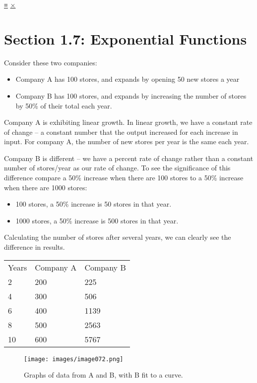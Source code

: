 \protect\hyperlink{main-nav}{≡} \protect\hyperlink{close-nav}{×}

\hypertarget{section-1.7-exponential-functions}{%
\section{Section 1.7: Exponential
Functions}\label{section-1.7-exponential-functions}}

Consider these two companies:

\begin{itemize}
\tightlist
\item
  Company A has 100 stores, and expands by opening 50 new stores a year
\item
  Company B has 100 stores, and expands by increasing the number of
  stores by 50\% of their total each year.
\end{itemize}

Company A is exhibiting linear growth. In linear growth, we have a
constant rate of change -- a constant number that the output increased
for each increase in input. For company A, the number of new stores per
year is the same each year.

Company B is different -- we have a percent rate of change rather than a
constant number of stores/year as our rate of change. To see the
significance of this difference compare a 50\% increase when there are
100 stores to a 50\% increase when there are 1000 stores:

\begin{itemize}
\tightlist
\item
  100 stores, a 50\% increase is 50 stores in that year.
\item
  1000 stores, a 50\% increase is 500 stores in that year.
\end{itemize}

Calculating the number of stores after several years, we can clearly see
the difference in results.

\begin{longtable}[]{@{}lll@{}}
\toprule
\endhead
Years & Company A & Company B\tabularnewline
2 & 200 & 225\tabularnewline
4 & 300 & 506\tabularnewline
6 & 400 & 1139\tabularnewline
8 & 500 & 2563\tabularnewline
10 & 600 & 5767\tabularnewline
\bottomrule
\end{longtable}

\begin{figure}
\centering
\texttt{[image: images/image072.png]}
\caption{Graphs of data from A and B, with B fit to a curve.}
\end{figure}

